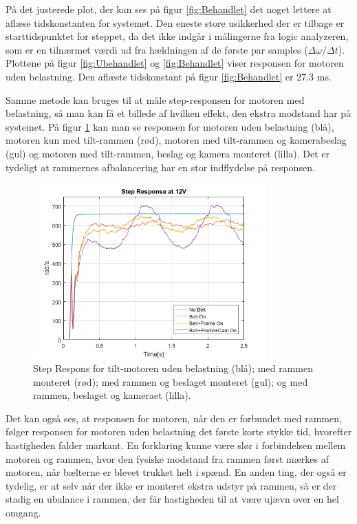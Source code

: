 På det justerede plot, der kan ses på figur \ref{fig:Behandlet} det noget lettere at aflæse tidskonstanten for systemet. Den eneste store usikkerhed der er tilbage er starttidspunktet for steppet, da det ikke indgår i målingerne fra logic analyzeren, som er en tilnærmet værdi ud fra hældningen af de første par samples ($\Delta\omega/\Delta t$). Plottene på figur \ref{fig:Ubehandlet} og \ref{fig:Behandlet} viser responsen for motoren uden belastning. Den aflæste tidskonstant på figur \ref{fig:Behandlet} er 27.3 ms.

Samme metode kan bruges til at måle step-responsen for motoren med belastning, så man kan få et billede af hvilken effekt, den ekstra modstand har på systemet. På figur \ref{fig:Combined} kan man se responsen for motoren uden belastning (blå), motoren kun med tilt-rammen (rød), motoren med tilt-rammen og kamerabeslag (gul) og motoren med tilt-rammen, beslag og kamera monteret (lilla). Det er tydeligt at rammernes afbalancering har en stor indflydelse på responsen.

\begin{figure}[!ht]
	\begin{center}
		\includegraphics[width=0.8\textwidth]{Billeder/Response_Combined.png}
	\end{center}
	\caption{Step Respons for tilt-motoren uden belastning (blå); med rammen monteret (rød); med rammen og beslaget monteret (gul); og med rammen, beslaget og kameraet (lilla).}
	\label{fig:Combined}
\end{figure}

Det kan også ses, at responsen for motoren, når den er forbundet med rammen, følger responsen for motoren uden belastning det første korte stykke tid, hvorefter hastigheden falder markant. En forklaring kunne være slør i forbindelsen mellem motoren og rammen, hvor den fysiske modstand fra rammen først mærkes af motoren, når bælterne er blevet trukket helt i spænd. En anden ting, der også er tydelig, er at selv når der ikke er monteret ekstra udstyr på rammen, så er der stadig en ubalance i rammen, der får hastigheden til at være ujævn over en hel omgang.

